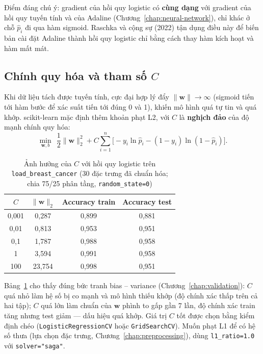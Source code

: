 Điểm đáng chú ý: gradient của hồi quy logistic có \textbf{cùng dạng} với gradient của hồi quy tuyến tính và của Adaline (Chương~\ref{chap:neural-network}), chỉ khác ở chỗ $\hat{p}_i$ đi qua hàm sigmoid. Raschka và cộng sự (2022) tận dụng điều này để biến bản cài đặt Adaline thành hồi quy logistic chỉ bằng cách thay hàm kích hoạt và hàm mất mát.

\subsection{Chính quy hóa và tham số $C$}

Khi dữ liệu tách được tuyến tính, cực đại hợp lý đẩy $\|\mathbf{w}\| \to \infty$ (sigmoid tiến tới hàm bước để xác suất tiến tới đúng 0 và 1), khiến mô hình quá tự tin và quá khớp. scikit-learn mặc định thêm khoản phạt L2, với $C$ là \textbf{nghịch đảo} của độ mạnh chính quy hóa:
\begin{equation}
    \min_{\mathbf{w}, b}\ \ \frac{1}{2}\|\mathbf{w}\|_2^2 + C\sum_{i=1}^{n}\Big[-y_i\ln\hat{p}_i - (1 - y_i)\ln(1 - \hat{p}_i)\Big].
\end{equation}

\begin{table}[H]
\centering
\begin{tabular}{|c|c|c|c|}
\hline
$C$ & $\|\mathbf{w}\|_2$ & \textbf{Accuracy train} & \textbf{Accuracy test} \\
\hline
0,001 & 0,287 & 0,899 & 0,881 \\ \hline
0,01 & 0,813 & 0,953 & 0,951 \\ \hline
0,1 & 1,787 & 0,988 & 0,958 \\ \hline
1 & 3,594 & 0,991 & 0,958 \\ \hline
100 & 23,754 & 0,998 & 0,951 \\ \hline
\end{tabular}
\caption{Ảnh hưởng của $C$ với hồi quy logistic trên \texttt{load\_breast\_cancer} (30 đặc trưng đã chuẩn hóa; chia 75/25 phân tầng, \texttt{random\_state=0})}
\label{tab:logreg-C}
\end{table}

Bảng~\ref{tab:logreg-C} cho thấy đúng bức tranh bias -- variance (Chương~\ref{chap:validation}): $C$ quá nhỏ làm hệ số bị co mạnh và mô hình thiếu khớp (độ chính xác thấp trên cả hai tập); $C$ quá lớn làm chuẩn của $\mathbf{w}$ phình to gấp gần 7 lần, độ chính xác train tăng nhưng test giảm --- dấu hiệu quá khớp. Giá trị $C$ tốt được chọn bằng kiểm định chéo (\texttt{LogisticRegressionCV} hoặc \texttt{GridSearchCV}). Muốn phạt L1 để có hệ số thưa (lựa chọn đặc trưng, Chương~\ref{chap:preprocessing}), dùng \texttt{l1\_ratio=1.0} với \texttt{solver="saga"}.


